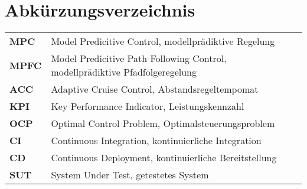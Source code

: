 
\begingroup 
\let\clearpage\relax
\let\cleardoublepage\relax
\let\cleardoublepage\relax

\chapter*{Abkürzungsverzeichnis}
\thispagestyle{empty}
\vspace{-.5em} %
\begin{tabular}{@{} p{\figurelabelwidth} @{} p{\textwidth-\figurelabelwidth}}
\textbf{MPC} & Model Predicitive Control, modellprädiktive Regelung\\
\textbf{MPFC} & Model Predicitive Path Following Control, modellprädiktive Pfadfolgeregelung\\
\textbf{ACC} & Adaptive Cruise Control, Abstandsregeltempomat\\
\textbf{KPI} & Key Performance Indicator, Leistungskennzahl\\
\textbf{OCP} & Optimal Control Problem, Optimalsteuerungsproblem \\
\textbf{CI} & Continuous Integration, kontinuierliche Integration\\
\textbf{CD} & Continuous Deployment, kontinuierliche Bereitstellung\\
\textbf{SUT} & System Under Test, getestetes System\\
\end{tabular}                
\endgroup
\cleardoublepage